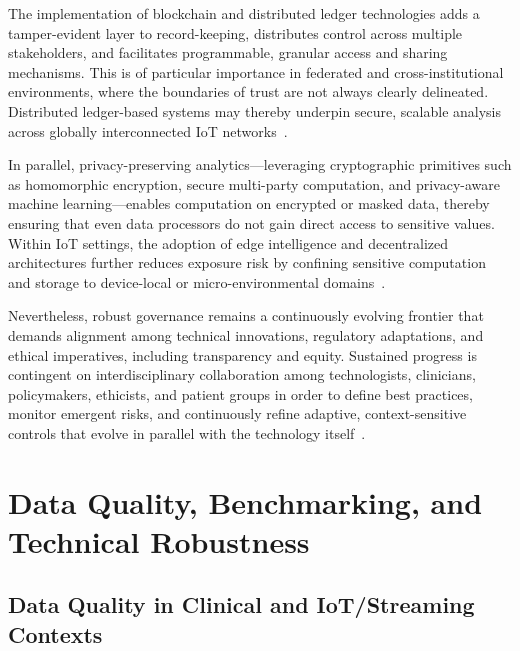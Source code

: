 \documentclass[sigconf]{acmart}
\begin{document}
The implementation of blockchain and distributed ledger technologies adds a tamper-evident layer to record-keeping, distributes control across multiple stakeholders, and facilitates programmable, granular access and sharing mechanisms. This is of particular importance in federated and cross-institutional environments, where the boundaries of trust are not always clearly delineated. Distributed ledger-based systems may thereby underpin secure, scalable analysis across globally interconnected IoT networks~\cite{ref4, ref5, ref10, ref13, ref14, ref16, ref17, ref18, ref19, ref20, ref21, ref22, ref23, ref24, ref25, ref30, ref31, ref33, ref34, ref35, ref44, ref45, ref46, ref50, ref51, ref61, ref62, ref64, ref65, ref76, ref77, ref91, ref106}.

In parallel, privacy-preserving analytics—leveraging cryptographic primitives such as homomorphic encryption, secure multi-party computation, and privacy-aware machine learning—enables computation on encrypted or masked data, thereby ensuring that even data processors do not gain direct access to sensitive values. Within IoT settings, the adoption of edge intelligence and decentralized architectures further reduces exposure risk by confining sensitive computation and storage to device-local or micro-environmental domains~\cite{ref4, ref5, ref10, ref16, ref17, ref18, ref19, ref20, ref21, ref22, ref23, ref24, ref25, ref44, ref45, ref61, ref62, ref64, ref65, ref76, ref77, ref91, ref106}.

Nevertheless, robust governance remains a continuously evolving frontier that demands alignment among technical innovations, regulatory adaptations, and ethical imperatives, including transparency and equity. Sustained progress is contingent on interdisciplinary collaboration among technologists, clinicians, policymakers, ethicists, and patient groups in order to define best practices, monitor emergent risks, and continuously refine adaptive, context-sensitive controls that evolve in parallel with the technology itself~\cite{ref91, ref106}.

\section{Data Quality, Benchmarking, and Technical Robustness}

\subsection{Data Quality in Clinical and IoT/Streaming Contexts}
\end{document}
